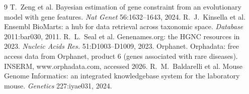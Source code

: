 \documentclass[11pt]{article}
\begin{document}
\begin{thebibliography}{9}
 T.~Zeng et al. Bayesian estimation of gene constraint from an evolutionary model with gene features. \emph{Nat Genet} 56:1632--1643, 2024.
 R.~J.~Kinsella et al. Ensembl BioMarts: a hub for data retrieval across taxonomic space. \emph{Database} 2011:bar030, 2011.
 R.~L.~Seal et al. Genenames.org: the HGNC resources in 2023. \emph{Nucleic Acids Res.} 51:D1003--D1009, 2023.
 Orphanet. Orphadata: free access data from Orphanet, product 6 (genes associated with rare diseases). INSERM, www.orphadata.com, accessed 2026.
 R.~M.~Baldarelli et al. Mouse Genome Informatics: an integrated knowledgebase system for the laboratory mouse. \emph{Genetics} 227:iyae031, 2024.
\end{thebibliography}

\end{document}
